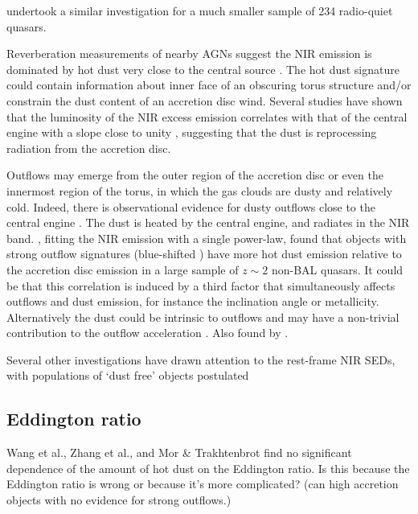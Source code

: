 \citet{gallagher07} undertook a similar investigation for a much smaller sample of 234 radio-quiet quasars.

Reverberation measurements of nearby AGNs suggest the NIR emission is dominated by hot dust very close to the central source \citep[few tens of light days; e.g.][]{minezaki04,suganuma06}. 
The hot dust signature could contain information about inner face of an obscuring torus structure and/or constrain the dust content of an accretion disc wind. 
Several studies have shown that the luminosity of the NIR excess emission correlates with that of the central engine with a slope close to unity \cite[e.g.][]{gallagher07}, suggesting that the dust is reprocessing radiation from the accretion disc. 

Outflows may emerge from the outer region of the accretion disc or even the innermost region of the torus, in which the gas clouds are dusty and relatively cold.  
Indeed, there is observational evidence for dusty outflows close to the central engine \citep[e.g.][]{bowler14}.
The dust is heated by the central engine, and radiates in the NIR band. 
\citet{wang13}, fitting the NIR emission with a single power-law, found that objects with strong outflow signatures (blue-shifted ) have more hot dust emission relative to the accretion disc emission in a large sample of $z\sim2$ non-BAL quasars. 
It could be that this correlation is induced by a third factor that simultaneously affects outflows and dust emission, for instance the inclination angle or metallicity. 
Alternatively the dust could be intrinsic to outflows and may have a non-trivial contribution to the outflow acceleration \citep[e.g.][]{fabian12}. 
Also found by \citet{shen14}. 

Several other investigations have drawn attention to the rest-frame NIR SEDs, with populations of `dust free' objects postulated \citep{hao10,hao11,jiang10,mor11} 


\subsection{Eddington ratio}

Wang et al., Zhang et al., and Mor \& Trakhtenbrot find no significant dependence of the amount of hot dust on the Eddington ratio. 
Is this because the Eddington ratio is wrong or because it's more complicated? (can high accretion objects with no evidence for strong outflows.)

